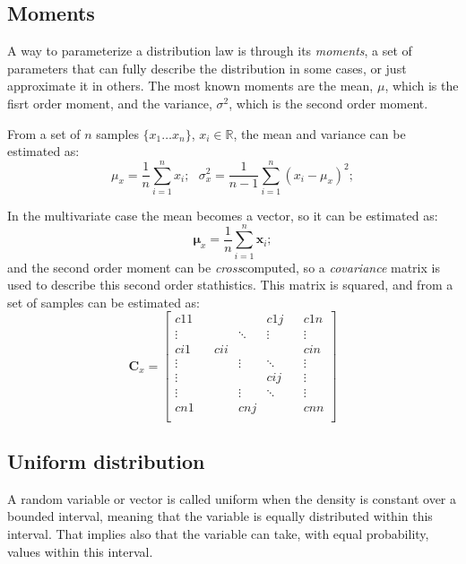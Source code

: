 \subsection{Moments}
A way to parameterize a distribution law is through its \textit{moments}, a set of parameters that can fully describe the distribution in some cases, or just approximate it in others. The most known moments are the mean, $\mu$, which is the fisrt order moment, and the variance, $\sigma^2$, which is the second order moment. %

From a set of $n$ samples $\{x_1\dots x_n\}$, $x_i \in\mathbb{R}$, the mean and variance can be estimated as:
\begin{equation}
 \mu_x = \frac{1}{n}\sum^n_{i=1} x_i;\ \ \ \sigma^2_x = \frac{1}{n-1}\sum^n_{i=1} (x_i-\mu_x)^2;
\end{equation}

In the multivariate case the mean becomes a vector, so it can be estimated as:
\begin{equation}
 \boldsymbol\mu_x = \frac{1}{n}\sum^n_{i=1} \mathbf{x}_i;
\end{equation}
and the second order moment can be \textit{cross}computed, so a \textit{covariance} matrix is used to describe this second order stathistics. This matrix is squared, and from a set of samples can be estimated as: 
\begin{equation}
 \mathbf{C}_x = 
 \left[
 \begin{array}{ccccccc}
  c11 &  & & & c1j &  & c1n \\
  \vdots & & & \ddots & \vdots & & \vdots \\
  ci1 &  & cii & & & & cin \\
  \vdots & & & \vdots & \ddots & & \vdots \\
  \vdots & & & & cij & & \vdots \\
  \vdots & & & \vdots & \ddots & & \vdots \\
  cn1 &  & & cnj & & & cnn \\
 \end{array}
 \right]
\end{equation}



\subsection{Uniform distribution}
A random variable or vector is called uniform when the density is constant over a bounded interval, meaning that the variable is equally distributed within this interval. That implies also that the variable can take, with equal probability, values within this interval. 

